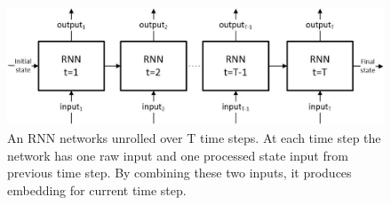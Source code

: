 \documentclass[10pt,twocolumn,letterpaper]{article}
\begin{document}
\begin{figure}[h]
	\begin{center}
		\includegraphics[width=\linewidth]{rnn_network2}
	\end{center}
	\caption{An RNN networks unrolled over T time steps. At each time step the network has one raw input and one processed state input from previous time step. By combining these two inputs, it produces embedding for current time step.}
	\label{fig:rnn_network}
\end{figure}
 

\end{document}

